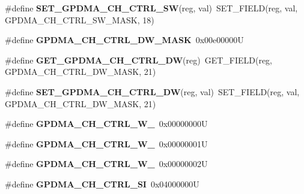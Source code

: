 \begin{DoxyCompactItemize}
\item 
\mbox{\label{group__lpc24xx__regs_ga2c41b5ba5385140319eee6b3a607ead8}} 
\#define {\bfseries S\+E\+T\+\_\+\+G\+P\+D\+M\+A\+\_\+\+C\+H\+\_\+\+C\+T\+R\+L\+\_\+\+SW}(reg,  val)~S\+E\+T\+\_\+\+F\+I\+E\+LD(reg, val, G\+P\+D\+M\+A\+\_\+\+C\+H\+\_\+\+C\+T\+R\+L\+\_\+\+S\+W\+\_\+\+M\+A\+SK, 18)
\item 
\mbox{\label{group__lpc24xx__regs_ga2720e2ea83ce311f205984b8ee1df839}} 
\#define {\bfseries G\+P\+D\+M\+A\+\_\+\+C\+H\+\_\+\+C\+T\+R\+L\+\_\+\+D\+W\+\_\+\+M\+A\+SK}~0x00e00000U
\item 
\mbox{\label{group__lpc24xx__regs_ga46abce7abef6dc7ad3400602b6ddfe8f}} 
\#define {\bfseries G\+E\+T\+\_\+\+G\+P\+D\+M\+A\+\_\+\+C\+H\+\_\+\+C\+T\+R\+L\+\_\+\+DW}(reg)~G\+E\+T\+\_\+\+F\+I\+E\+LD(reg, G\+P\+D\+M\+A\+\_\+\+C\+H\+\_\+\+C\+T\+R\+L\+\_\+\+D\+W\+\_\+\+M\+A\+SK, 21)
\item 
\mbox{\label{group__lpc24xx__regs_ga88a93001241155d57ec601dcd55dc584}} 
\#define {\bfseries S\+E\+T\+\_\+\+G\+P\+D\+M\+A\+\_\+\+C\+H\+\_\+\+C\+T\+R\+L\+\_\+\+DW}(reg,  val)~S\+E\+T\+\_\+\+F\+I\+E\+LD(reg, val, G\+P\+D\+M\+A\+\_\+\+C\+H\+\_\+\+C\+T\+R\+L\+\_\+\+D\+W\+\_\+\+M\+A\+SK, 21)
\item 
\mbox{\label{group__lpc24xx__regs_ga8cac76564d8a91df87627507aa1e7dbd}} 
\#define {\bfseries G\+P\+D\+M\+A\+\_\+\+C\+H\+\_\+\+C\+T\+R\+L\+\_\+\+W\+\_}~0x00000000U
\item 
\mbox{\label{group__lpc24xx__regs_ga3bdd1e680e05b4f10c41f9253ceaff3c}} 
\#define {\bfseries G\+P\+D\+M\+A\+\_\+\+C\+H\+\_\+\+C\+T\+R\+L\+\_\+\+W\+\_}~0x00000001U
\item 
\mbox{\label{group__lpc24xx__regs_ga6feea9a3d042bbc0baa99ebedcc99264}} 
\#define {\bfseries G\+P\+D\+M\+A\+\_\+\+C\+H\+\_\+\+C\+T\+R\+L\+\_\+\+W\+\_}~0x00000002U
\item 
\mbox{\label{group__lpc24xx__regs_ga08d2c117cf018293bdc6bba999cbaed3}} 
\#define {\bfseries G\+P\+D\+M\+A\+\_\+\+C\+H\+\_\+\+C\+T\+R\+L\+\_\+\+SI}~0x04000000U

\end{DoxyCompactItemize}
